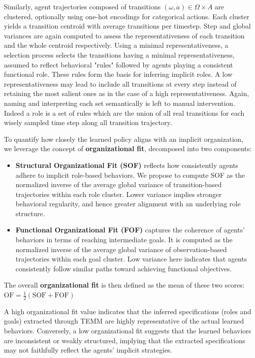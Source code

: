 \documentclass[pdflatex,sn-mathphys-num]{sn-jnl}%
\theoremstyle{thmstyleone}%
\theoremstyle{thmstyletwo}%
\theoremstyle{thmstylethree}%
\begin{document}
Similarly, agent trajectories composed of transitions $(\omega, a) \in \Omega \times A$ are clustered, optionally using one-hot encodings for categorical actions. Each cluster yields a transition centroid with average transitions per timestep. Step and global variances are again computed to assess the representativeness of each transition and the whole centroid respectively.
%
Using a minimal representativeness, a selection process selects the transitions having a minimal representativeness, assumed to reflect behavioral "rules" followed by agents playing a consistent functional role. These rules form the basis for inferring implicit roles. A low representativeness may lead to include all transitions at every step instead of retaining the most salient ones as in the case of a high representativeness. Again, naming and interpreting each set semantically is left to manual intervention. Indeed a role is a set of rules which are the union of all real transitions for each wisely sampled time step along all transition trajectory.

To quantify how closely the learned policy aligns with an implicit organization, we leverage the concept of \textbf{organizational fit}, decomposed into two components:
%
\begin{itemize}
    \item \textbf{Structural Organizational Fit (SOF)} reflects how consistently agents adhere to implicit role-based behaviors. We propose to compute SOF as the normalized inverse of the average global variance of transition-based trajectories within each role cluster. Lower variance implies stronger behavioral regularity, and hence greater alignment with an underlying role structure.
    \item \textbf{Functional Organizational Fit (FOF)} captures the coherence of agents' behaviors in terms of reaching intermediate goals. It is computed as the normalized inverse of the average global variance of observation-based trajectories within each goal cluster. Low variance here indicates that agents consistently follow similar paths toward achieving functional objectives.
\end{itemize}
%
The overall \textbf{organizational fit} is then defined as the mean of these two scores: $\text{OF} = \frac{1}{2} \left( \text{SOF} + \text{FOF} \right)$

A high organizational fit value indicates that the inferred specifications (roles and goals) extracted through TEMM are highly representative of the actual learned behaviors. Conversely, a low organizational fit suggests that the learned behaviors are inconsistent or weakly structured, implying that the extracted specifications may not faithfully reflect the agents' implicit strategies.
\end{document}
